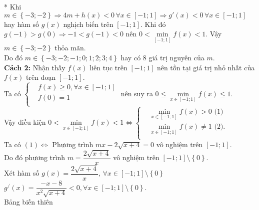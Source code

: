 \begin{ex}
{		* Khi $m\in \left\{ -3;-2 \right\}\Rightarrow 4m+h(x)<0\,\forall x\in [-1;1]\Rightarrow g'(x)<0\,\forall x\in [-1;1]$ hay hàm số $g(x)$ nghịch biến trên $[-1;1]$. Khi đó $g(-1)>g(0)\Rightarrow -1<g(-1)<0$ nên $0<\min\limits_{[-1;1]}f(x)<1$. Vậy $m\in \left\{ -3;-2 \right\}$ thỏa mãn.\\
		Do đó $m\in \left\{ -3;-2;-1;0;1;2;3;4 \right\}$ hay có $8$ giá trị nguyên của $m$.\\
		\textbf{Cách 2:}
		Nhận thấy $f(x)$ liên tục trên $[-1;1]$ nên tồn tại giá trị nhỏ nhất của $f(x)$ trên đoạn $[-1;1]$.\\
		Ta có $\left\{ \begin{aligned}
			& f(x)\ge 0,\forall x\in [-1;1] \\
			& f(0)=1 \\
		\end{aligned} \right.$ nên suy ra $0\le \min\limits_{x\in [-1;1]}f(x)\le 1$.\\
		Vậy điều kiện $0<\min\limits_{x\in [-1;1]}f(x)<1\Leftrightarrow \left\{ \begin{aligned}
			& \min\limits_{x\in [-1;1]}f(x)>0\text{ (1)} \\
			& \min\limits_{x\in [-1;1]}f(x)\ne 1\text{ (2).} \\
		\end{aligned} \right.$\\
		Ta có $(1)\Leftrightarrow $ Phương trình $mx-2\sqrt{x+4}=0$ vô nghiệm trên $[-1;1]$.\\
		Do đó phương trình $m=\dfrac{2\sqrt{x+4}}{x}$ vô nghiệm trên $[-1;1]\setminus \left\{ 0 \right\}$.\\
		Xét hàm số $g(x)=\dfrac{2\sqrt{x+4}}{x},\,\forall x\in [-1;1]\setminus \left\{ 0 \right\}$
		${g^{/}}(x)=\dfrac{-x-8}{x^2\sqrt{x+4}}<0,\forall x\in [-1;1]\setminus \left\{ 0 \right\}$.\\
		Bảng biến thiên
		\begin{center}
\end{center}}
\end{ex}
